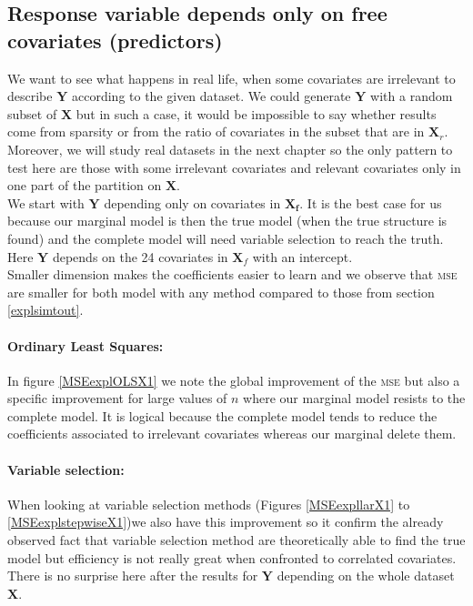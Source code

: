\documentclass[12pt,a4paper]{report}
\begin{document}
\clearpage
\newpage
\subsection{Response variable depends only on free covariates (predictors)}	 \label{tableMSEsimdroite}
\FloatBarrier
 We want to see what happens in real life, when some covariates are irrelevant to describe $\boldsymbol{Y}$ according to the given dataset. We could generate $\boldsymbol{Y}$ with a random subset of $\boldsymbol{X}$ but in such a case, it would be impossible to say whether results come from sparsity or from the ratio of covariates in the subset that are in $\boldsymbol{X}_{r}$. Moreover, we will study real datasets in the next chapter so the only pattern to test here are those with some irrelevant covariates and relevant covariates only in one part of the partition on $\boldsymbol{X}$. \\
 
 	We start with $\boldsymbol{Y}$ depending only on covariates in $\boldsymbol{X_{f}}$. It is the best case for us because our marginal model is then the true model (when the true structure is found) and the complete model will need variable selection to reach the truth. Here $\boldsymbol{Y}$ depends on the 24 covariates in $\boldsymbol{X}_{f}$ with an intercept.\\
 	
 	Smaller dimension makes the coefficients easier to learn and we observe that \textsc{mse} are smaller for both model with any method compared to those from section \ref{explsimtout}.\\
 	
 	\paragraph{Ordinary Least Squares:} In figure \ref{MSEexplOLSX1} we note the global improvement of the \textsc{mse} but also a specific improvement for large values of $n$ where our marginal model resists to the complete model. It is logical because the complete model tends to reduce the coefficients associated to irrelevant covariates whereas our marginal delete them. \\
 	
 	\paragraph{Variable selection:} When looking at variable selection methods  (Figures \ref{MSEexpllarX1} to \ref{MSEexplstepwiseX1})we also have this improvement so it confirm the already observed fact that variable selection method are theoretically able to find the true model but efficiency is not really great when confronted to correlated covariates. There is no surprise here after the results for $\boldsymbol{Y}$ depending on the whole dataset $\boldsymbol{X}$. \\
 	
\end{document}
